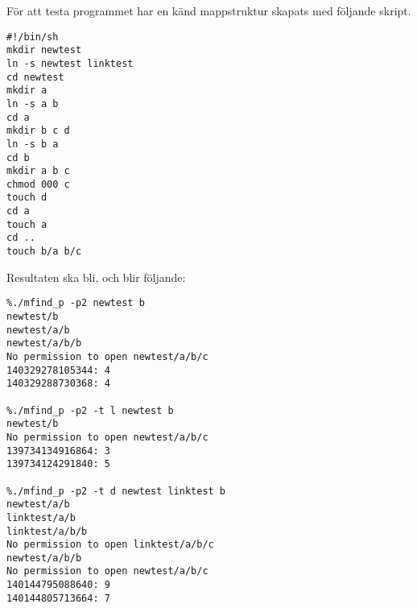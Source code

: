 För att testa programmet har en känd mappstruktur skapats med följande skript.
\begin{verbatim}
#!/bin/sh
mkdir newtest
ln -s newtest linktest
cd newtest
mkdir a
ln -s a b
cd a
mkdir b c d
ln -s b a
cd b
mkdir a b c
chmod 000 c
touch d
cd a
touch a
cd ..
touch b/a b/c
\end{verbatim}

Resultaten ska bli,  och blir följande:
\begin{verbatim}
%./mfind_p -p2 newtest b
newtest/b
newtest/a/b
newtest/a/b/b
No permission to open newtest/a/b/c
140329278105344: 4
140329288730368: 4

%./mfind_p -p2 -t l newtest b
newtest/b
No permission to open newtest/a/b/c
139734134916864: 3
139734124291840: 5

%./mfind_p -p2 -t d newtest linktest b
newtest/a/b
linktest/a/b
linktest/a/b/b
No permission to open linktest/a/b/c
newtest/a/b/b
No permission to open newtest/a/b/c
140144795088640: 9
140144805713664: 7
\end{verbatim}